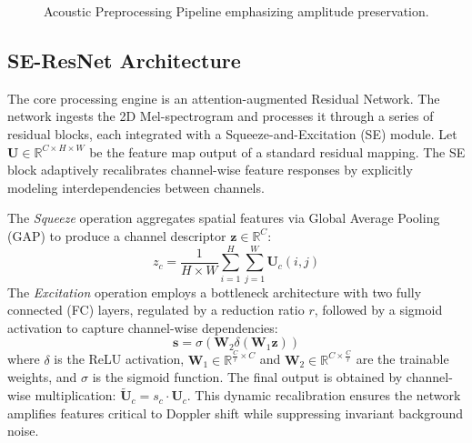 \documentclass[conference]{IEEEtran}
\begin{document}
\begin{figure}[htbp]
\centering
{}
\caption{Acoustic Preprocessing Pipeline emphasizing amplitude preservation.}
\label{fig:preprocessing}
\end{figure}

\subsection{SE-ResNet Architecture}
The core processing engine is an attention-augmented Residual Network. The network ingests the 2D Mel-spectrogram and processes it through a series of residual blocks, each integrated with a Squeeze-and-Excitation (SE) module. Let $\mathbf{U} \in \mathbb{R}^{C \times H \times W}$ be the feature map output of a standard residual mapping. The SE block adaptively recalibrates channel-wise feature responses by explicitly modeling interdependencies between channels.

The \textit{Squeeze} operation aggregates spatial features via Global Average Pooling (GAP) to produce a channel descriptor $\mathbf{z} \in \mathbb{R}^{C}$:
\begin{equation}
    z_c = \frac{1}{H \times W} \sum_{i=1}^{H} \sum_{j=1}^{W} \mathbf{U}_{c}(i, j)
\end{equation}
The \textit{Excitation} operation employs a bottleneck architecture with two fully connected (FC) layers, regulated by a reduction ratio $r$, followed by a sigmoid activation to capture channel-wise dependencies:
\begin{equation}
    \mathbf{s} = \sigma\left( \mathbf{W}_2 \delta\left( \mathbf{W}_1 \mathbf{z} \right) \right)
\end{equation}
where $\delta$ is the ReLU activation, $\mathbf{W}_1 \in \mathbb{R}^{\frac{C}{r} \times C}$ and $\mathbf{W}_2 \in \mathbb{R}^{C \times \frac{C}{r}}$ are the trainable weights, and $\sigma$ is the sigmoid function. The final output is obtained by channel-wise multiplication: $\widetilde{\mathbf{U}}_c = s_c \cdot \mathbf{U}_c$. 
This dynamic recalibration ensures the network amplifies features critical to Doppler shift while suppressing invariant background noise.
\end{document}
